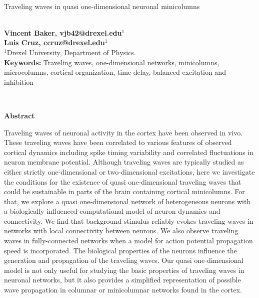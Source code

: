 \documentclass[12pt]{article}
\begin{document}
\hspace{13.9cm}

\ \vspace{20mm}\\

{\LARGE Traveling waves in quasi one-dimensional neuronal minicolumns}

\ \\
{\bf \large Vincent Baker, vjb42@drexel.edu$^{\displaystyle 1}$}\\
{\bf \large Luis Cruz, ccruz@drexel.edu$^{\displaystyle 1}$}\\
{$^{\displaystyle 1}$Drexel University, Department of Physics.}\\
%

{\bf Keywords:} Traveling waves, one-dimensional networks, minicolumns, microcolumns, cortical organization, time delay, balanced excitation and inhibition

\thispagestyle{empty}
%
\ \vspace{-0mm}\\
%
\begin{center} {\bf Abstract} \end{center}
Traveling waves of neuronal activity in the cortex have been observed in vivo.
These traveling waves have been correlated to various features of observed cortical dynamics including spike timing variability and correlated fluctuations in neuron membrane potential.
Although traveling waves are typically studied as either strictly one-dimensional or two-dimensional excitations, here we investigate the conditions for the existence of quasi  one-dimensional traveling waves that could be sustainable in parts of the brain containing cortical minicolumns.
For that, we explore a quasi  one-dimensional network of heterogeneous neurons with a biologically influenced computational model of neuron dynamics and connectivity.
We find that background stimulus reliably evokes traveling waves in networks with local connectivity between neurons.
We also observe traveling waves in fully-connected networks when a model for action potential propagation speed is incorporated.
The biological properties of the neurons influence the generation and propagation of the traveling waves. 
Our quasi  one-dimensional model is not only useful for studying the basic properties of traveling waves in neuronal networks, but it also provides a simplified representation of possible wave propagation in columnar or minicolumnar networks found in the cortex.
\end{document}
